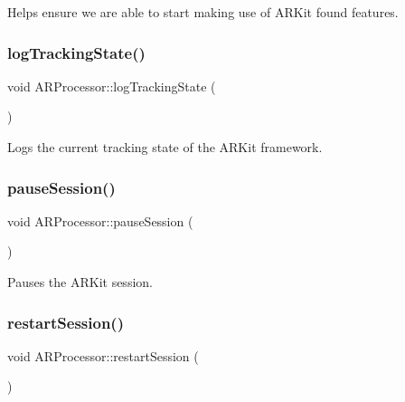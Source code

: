 Helps ensure we are able to start making use of A\+R\+Kit found features. \mbox{\label{class_a_r_processor_a3ae7b56c7d5f555ec84dbd1f1f0a8f65}} 
\subsubsection{\texorpdfstring{log\+Tracking\+State()}{logTrackingState()}}
{\footnotesize\ttfamily void A\+R\+Processor\+::log\+Tracking\+State (\begin{DoxyParamCaption}{ }\end{DoxyParamCaption})}



Logs the current tracking state of the A\+R\+Kit framework. 

\mbox{\label{class_a_r_processor_a035d352220785ee03e1bb15ba6bf688d}} 
\subsubsection{\texorpdfstring{pause\+Session()}{pauseSession()}}
{\footnotesize\ttfamily void A\+R\+Processor\+::pause\+Session (\begin{DoxyParamCaption}{ }\end{DoxyParamCaption})}



Pauses the A\+R\+Kit session. 

\mbox{\label{class_a_r_processor_a121cd3925743680196771ce07058d52e}} 
\subsubsection{\texorpdfstring{restart\+Session()}{restartSession()}}
{\footnotesize\ttfamily void A\+R\+Processor\+::restart\+Session (\begin{DoxyParamCaption}{ }\end{DoxyParamCaption})}

